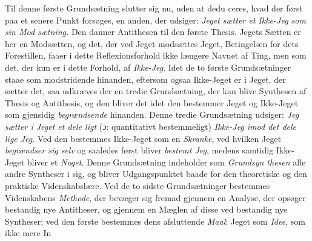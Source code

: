 \documentclass[12pt,a4paper]{book}
\begin{document}
Til denne første Grundsætning slutter sig nu, uden at dedu\-%
ceres, hvad der først paa et senere Punkt forsøges, en anden,
der udsiger: \emph{Jeget sætter et Ikke-Jeg som sin Mod\-%
sætning.} Den danner Antithesen til den første Thesis.
Jegets Sætten er her en Modsætten, og det, der ved Jeget
modsættes Jeget, Betingelsen for dets Forestillen, faaer i dette
Reflexionsforhold ikke længere Navnet af Ting, men som det,
der kun er i dette Forhold, af \emph{Ikke-Jeg}. Idet de to første
Grundsætninger staae som modstridende hinanden, eftersom
ogsaa Ikke-Jeget er i Jeget, der sætter det, saa udkræves der
en tredie Grundsætning, der kan blive Synthesen af Thesis
og Antithesis, og den bliver det idet den bestemmer Jeget og
Ikke-Jeget som gjensidig \emph{begrændsende} hinanden. Denne
tredie Grundsætning udsiger: \emph{Jeg sætter i Jeget et dele\-%
ligt} (ɔ: quantitativt bestemmeligt) \emph{Ikke-Jeg imod det dele\-%
lige Jeg}. Ved den bestemmes Ikke-Jeget som en \emph{Skranke},
ved hvilken Jeget \emph{begrændser sig selv} og saaledes først
bliver \emph{bestemt Jeg}, medens samtidig Ikke-Jeget bliver et
\emph{Noget}. Denne Grundsætning indeholder som \emph{Grundsyn\-%
thesen} alle andre Syntheser i sig, og bliver Udgangspunktet
baade for den theoretiske og den praktiske Videnskabslære.
Ved de to sidste Grundsætninger bestemmes Videnskabens
\emph{Methode}, der bevæger sig fremad gjennem en Analyse, der
opsøger bestandig nye Antitheser, og gjennem en Mæglen af
disse ved bestandig nye Syntheser; ved den første bestemmes
dens afsluttende \emph{Maal}: Jeget som \emph{Idee}, som ikke mere In\-%
\end{document}
